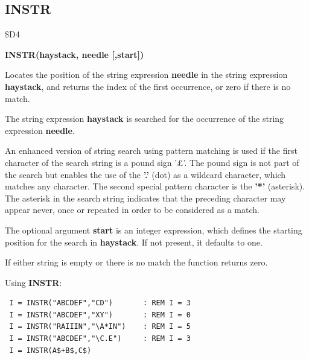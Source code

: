 \subsection{INSTR}
\begin{description}[leftmargin=2cm,style=nextline]
\item [Token:] \$D4
\item [Format:] {\bf INSTR(haystack, needle [,start])}
\item [Usage:] Locates the
               position of the string expression {\bf needle}
               in the string expression {\bf haystack}, and
               returns the index of the first occurrence,
               or zero if there is no match.

               The string expression {\bf haystack}
               is searched for the occurrence of the
               string expression
               {\bf needle}.

               An enhanced version of string search using pattern
               matching is used if the first character of
               the search string is a pound sign '£'.
               The pound sign is not part of the search but enables the use
               of the {\bf '.'} (dot) as a wildcard character, which matches any
               character. The second special pattern character is
               the {\bf '*'} (asterisk). The asterisk in the search string indicates
               that the preceding character may appear never, once or repeated
               in order to be considered as a match.

               The optional argument {\bf start} is an integer
               expression, which defines the starting position
               for the search in {\bf haystack}. If not present,
               it defaults to one.

\item [Remarks:] If either string is empty or there is no match
               the function returns zero.

\item [Examples:] Using {\bf INSTR}:
\begin{tcolorbox}[colback=black,coltext=white]
\verbatimfont{\codefont}
\begin{verbatim}
 I = INSTR("ABCDEF","CD")       : REM I = 3
 I = INSTR("ABCDEF","XY")       : REM I = 0
 I = INSTR("RAIIIN","\A*IN")    : REM I = 5
 I = INSTR("ABCDEF","\C.E")     : REM I = 3
 I = INSTR(A$+B$,C$)
\end{verbatim}
\end{tcolorbox}
\end{description}

